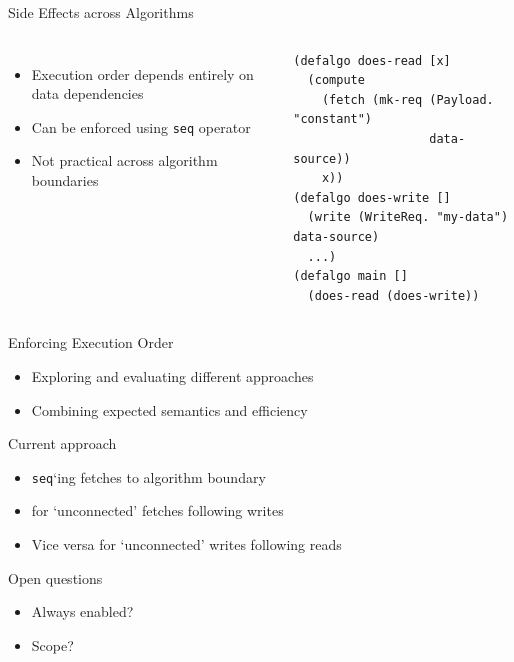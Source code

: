 \documentclass[utf8x,10pt,aspectratio=169]{beamer}
\begin{document}
\begin{frame}[fragile]{Side Effects across Algorithms}
	\begin{columns}
		
		\begin{itemize}
			\item Execution order depends entirely on data dependencies
			\item Can be enforced using \texttt{seq} operator
			\item Not practical across algorithm boundaries
		\end{itemize}
		
		\begin{verbatim}
(defalgo does-read [x]
  (compute 
    (fetch (mk-req (Payload. "constant") 
                   data-source)) 
    x))
(defalgo does-write []
  (write (WriteReq. "my-data") data-source)
  ...)
(defalgo main []
  (does-read (does-write))
		\end{verbatim}
		
	\end{columns}
\end{frame}

\begin{frame}{Enforcing Execution Order}

	\begin{itemize}[<+->]
		\item Exploring and evaluating different approaches
		\item Combining expected semantics and efficiency
	\end{itemize}
	
	\pause
	
	\begin{block}{Current approach}
		\begin{itemize}
			\item \texttt{seq}`ing fetches to algorithm boundary
			\item for `unconnected' fetches following writes
			\item Vice versa for `unconnected' writes following reads
		\end{itemize}
	\end{block}
	\pause
	\begin{block}{Open questions}
		\begin{itemize}
			\item Always enabled?
			\item Scope?
		\end{itemize}
	\end{block}

\end{frame}
\end{document}
